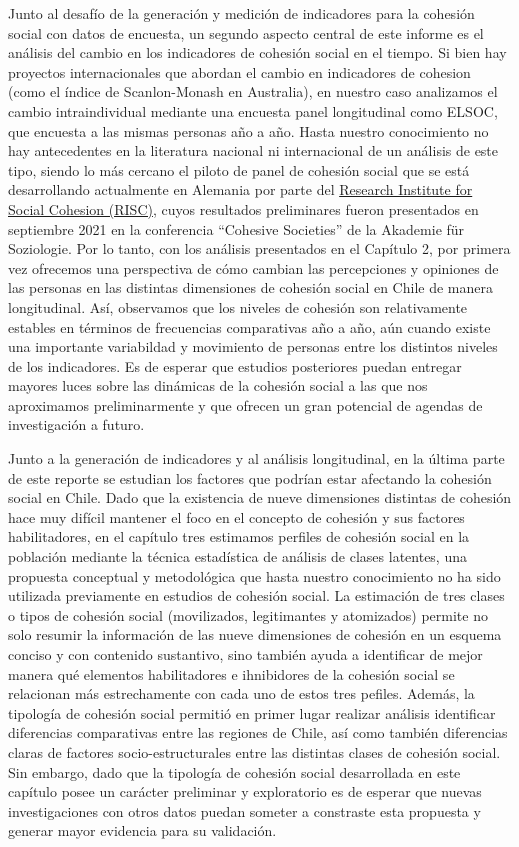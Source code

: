 \documentclass[
  12pt,
]{book}
\begin{document}
Junto al desafío de la generación y medición de indicadores para la cohesión social con datos de encuesta, un segundo aspecto central de este informe es el análisis del cambio en los indicadores de cohesión social en el tiempo. Si bien hay proyectos internacionales que abordan el cambio en indicadores de cohesion (como el índice de Scanlon-Monash en Australia), en nuestro caso analizamos el cambio intraindividual mediante una encuesta panel longitudinal como ELSOC, que encuesta a las mismas personas año a año. Hasta nuestro conocimiento no hay antecedentes en la literatura nacional ni internacional de un análisis de este tipo, siendo lo más cercano el piloto de panel de cohesión social que se está desarrollando actualmente en Alemania por parte del \href{https://www.fgz-risc.de/}{Research Institute for Social Cohesion (RISC)}, cuyos resultados preliminares fueron presentados en septiembre 2021 en la conferencia ``Cohesive Societies'' de la Akademie für Soziologie. Por lo tanto, con los análisis presentados en el Capítulo 2, por primera vez ofrecemos una perspectiva de cómo cambian las percepciones y opiniones de las personas en las distintas dimensiones de cohesión social en Chile de manera longitudinal. Así, observamos que los niveles de cohesión son relativamente estables en términos de frecuencias comparativas año a año, aún cuando existe una importante variabildad y movimiento de personas entre los distintos niveles de los indicadores. Es de esperar que estudios posteriores puedan entregar mayores luces sobre las dinámicas de la cohesión social a las que nos aproximamos preliminarmente y que ofrecen un gran potencial de agendas de investigación a futuro.

Junto a la generación de indicadores y al análisis longitudinal, en la última parte de este reporte se estudian los factores que podrían estar afectando la cohesión social en Chile. Dado que la existencia de nueve dimensiones distintas de cohesión hace muy difícil mantener el foco en el concepto de cohesión y sus factores habilitadores, en el capítulo tres estimamos perfiles de cohesión social en la población mediante la técnica estadística de análisis de clases latentes, una propuesta conceptual y metodológica que hasta nuestro conocimiento no ha sido utilizada previamente en estudios de cohesión social. La estimación de tres clases o tipos de cohesión social (movilizados, legitimantes y atomizados) permite no solo resumir la información de las nueve dimensiones de cohesión en un esquema conciso y con contenido sustantivo, sino también ayuda a identificar de mejor manera qué elementos habilitadores e ihnibidores de la cohesión social se relacionan más estrechamente con cada uno de estos tres pefiles. Además, la tipología de cohesión social permitió en primer lugar realizar análisis identificar diferencias comparativas entre las regiones de Chile, así como también diferencias claras de factores socio-estructurales entre las distintas clases de cohesión social. Sin embargo, dado que la tipología de cohesión social desarrollada en este capítulo posee un carácter preliminar y exploratorio es de esperar que nuevas investigaciones con otros datos puedan someter a constraste esta propuesta y generar mayor evidencia para su validación.
\end{document}
